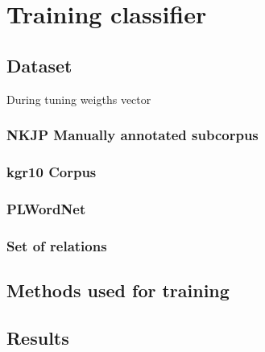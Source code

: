 \chapter{Training classifier}

\section{Dataset}
During tuning weigths vector 
\subsection{NKJP Manually annotated subcorpus}

\subsection{kgr10 Corpus}

\subsection{PLWordNet}

\subsection{Set of relations}

\section{Methods used for training}

\section{Results}
